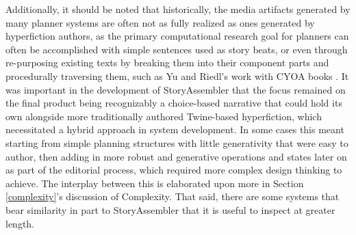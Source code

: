 Additionally, it should be noted that historically, the media artifacts generated by many planner systems are often not as fully realized as ones generated by hyperfiction authors, as the primary computational research goal for planners can often be accomplished with simple sentences used as story beats, or even through re-purposing existing texts by breaking them into their component parts and procedurally traversing them, such as Yu and Riedl's work with CYOA books \cite{Yu}. It was important in the development of StoryAssembler that the focus remained on the final product being recognizably a choice-based narrative that could hold its own alongside more traditionally authored Twine-based hyperfiction, which necessitated a hybrid approach in system development. In some cases this meant starting from simple planning structures with little generativity that were easy to author, then adding in more robust and generative operations and states later on as part of the editorial process, which required more complex design thinking to achieve. The interplay between this is elaborated upon more in Section \ref{complexity}'s discussion of Complexity. That said, there are some systems that bear similarity in part to StoryAssembler that it is useful to inspect at greater length.

